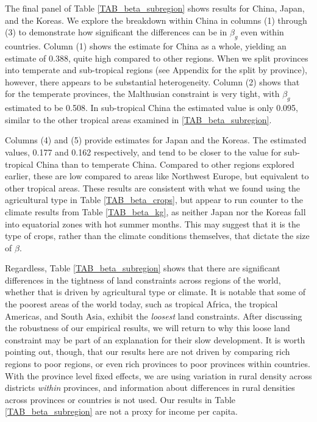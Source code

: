 \documentclass[11pt]{article}
\begin{document}
The final panel of Table \ref{TAB_beta_subregion} shows results for China, Japan, and the Koreas. We explore the breakdown within China in columns (1) through (3) to demonstrate how significant the differences can be in $\beta_g$ even within countries. Column (1) shows the estimate for China as a whole, yielding an estimate of 0.388, quite high compared to other regions. When we split provinces into temperate and sub-tropical regions (see Appendix for the split by province), however, there appears to be substantial heterogeneity. Column (2) shows that for the temperate provinces, the Malthusian constraint is very tight, with $\beta_g$ estimated to be 0.508. In sub-tropical China the estimated value is only 0.095, similar to the other tropical areas examined in \ref{TAB_beta_subregion}.

Columns (4) and (5) provide estimates for Japan and the Koreas. The estimated values, 0.177 and 0.162 respectively, and tend to be closer to the value for sub-tropical China than to temperate China. Compared to other regions explored earlier, these are low compared to areas like Northwest Europe, but equivalent to other tropical areas. These results are consistent with what we found using the agricultural type in Table \ref{TAB_beta_crops}, but appear to run counter to the climate results from Table \ref{TAB_beta_kg}, as neither Japan nor the Koreas fall into equatorial zones with hot summer months. This may suggest that it is the type of crops, rather than the climate conditions themselves, that dictate the size of $\beta$.

Regardless, Table \ref{TAB_beta_subregion} shows that there are significant differences in the tightness of land constraints across regions of the world, whether that is driven by agricultural type or climate. It is notable that some of the poorest areas of the world today, such as tropical Africa, the tropical Americas, and South Asia, exhibit the \textit{loosest} land constraints. After discussing the robustness of our empirical results, we will return to why this loose land constraint may be part of an explanation for their slow development. It is worth pointing out, though, that our results here are not driven by comparing rich regions to poor regions, or even rich provinces to poor provinces within countries. With the province level fixed effects, we are using variation in rural density across districts \textit{within} provinces, and information about differences in rural densities across provinces or countries is not used. Our results in Table \ref{TAB_beta_subregion} are not a proxy for income per capita. 
\end{document}
